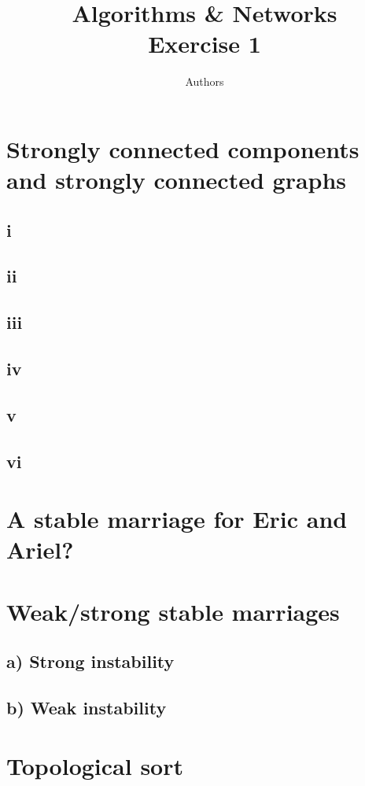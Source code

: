 \documentclass[a4paper]{article}
\author{Authors}
\title{Algorithms \& Networks \\ Exercise 1}
\begin{document}
\maketitle
\section{Strongly connected components and strongly connected graphs}
\subsection*{i}
\subsection*{ii}
\subsection*{iii}
\subsection*{iv}
\subsection*{v}
\subsection*{vi}

\section{A stable marriage for Eric and Ariel?}

\section{Weak/strong stable marriages}
\subsection*{a) Strong instability}
\subsection*{b) Weak instability}

\section{Topological sort}
\end{document}
